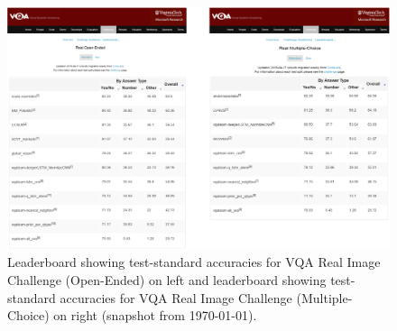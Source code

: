 \begin{figure}[h]
\includegraphics[width=1\linewidth]{figures/real-screenshot.pdf}
\centering
\caption{Leaderboard showing test-standard accuracies for VQA Real Image Challenge (Open-Ended) on left and leaderboard showing test-standard accuracies for VQA Real Image Challenge (Multiple-Choice) on right (snapshot from \today).}
\label{fig:leaderboard-oe}
\end{figure}

